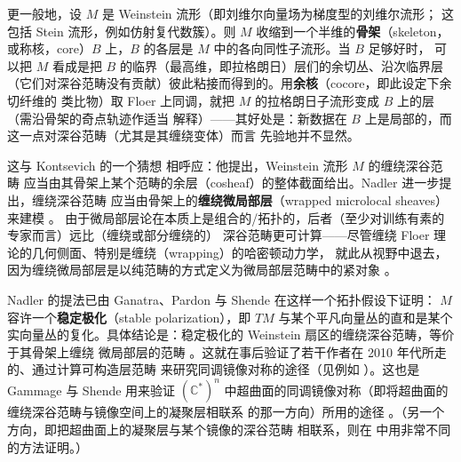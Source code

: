 \documentclass[UTF8,a4paper,11pt,fontset=windows]{ctexart}
\theoremstyle{cnthm}
\numberwithin{equation}{section}
\newcommand{\C}{\mathbb{C}}
\begin{document}
更一般地，设 $M$ 是 Weinstein 流形（即刘维尔向量场为梯度型的刘维尔流形；
这包括 Stein 流形，例如仿射复代数簇）。则 $M$ 收缩到一个半维的\textbf{骨架}（skeleton，
或称核，core）$B$ 上，$B$ 的各层是 $M$ 中的各向同性子流形。当 $B$ 足够好时，
可以把 $M$ 看成是把 $B$ 的临界（最高维，即拉格朗日）层们的余切丛、沿次临界层
（它们对深谷范畴没有贡献）彼此粘接而得到的。用\textbf{余核}（cocore，即此设定下余切纤维的
类比物）取 Floer 上同调，就把 $M$ 的拉格朗日子流形变成 $B$ 上的层（需沿骨架的奇点轨迹作适当
解释）——其好处是：新数据在 $B$ 上是局部的，而这一点对深谷范畴（尤其是其缠绕变体）而言
先验地并不显然。

这与 Kontsevich 的一个猜想 \cite{r66} 相呼应：他提出，Weinstein 流形 $M$ 的缠绕深谷范畴
应当由其骨架上某个范畴的余层（cosheaf）的整体截面给出。Nadler 进一步提出，缠绕深谷范畴
应当由骨架上的\textbf{缠绕微局部层}（wrapped microlocal sheaves）来建模 \cite{r76}。
由于微局部层论在本质上是组合的/拓扑的，后者（至少对训练有素的专家而言）远比（缠绕或部分缠绕的）
深谷范畴更可计算——尽管缠绕 Floer 理论的几何侧面、特别是缠绕（wrapping）的哈密顿动力学，
就此从视野中退去，因为缠绕微局部层是以纯范畴的方式定义为微局部层范畴中的紧对象 \cite{r76}。


Nadler 的提法已由 Ganatra、Pardon 与 Shende 在这样一个拓扑假设下证明：
$M$ 容许一个\textbf{稳定极化}（stable polarization），即 $TM$ 与某个平凡向量丛的直和是某个
实向量丛的复化。具体结论是：稳定极化的 Weinstein 扇区的缠绕深谷范畴，等价于其骨架上缠绕
微局部层的范畴 \cite{r58}。这就在事后验证了若干作者在 2010 年代所走的、通过计算可构造层范畴
来研究同调镜像对称的途径（见例如 \cite{r37,r77}）。这也是 Gammage 与 Shende 用来验证
$(\C^{*})^{n}$ 中超曲面的同调镜像对称（即将超曲面的缠绕深谷范畴与镜像空间上的凝聚层相联系
的那一方向）所用的途径 \cite{r50}。（另一个方向，即把超曲面上的凝聚层与某个镜像的深谷范畴
相联系，则在 \cite{r6} 中用非常不同的方法证明。）
\end{document}
